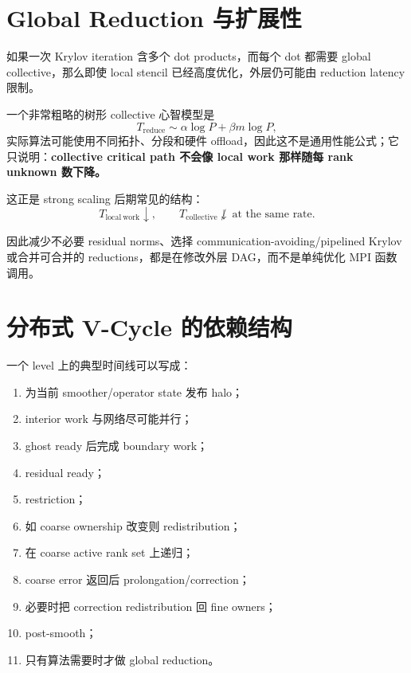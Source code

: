 \section{Global Reduction 与扩展性}

如果一次 Krylov iteration 含多个 dot products，而每个 dot 都需要 global collective，那么即使 local stencil 已经高度优化，外层仍可能由 reduction latency 限制。

一个非常粗略的树形 collective 心智模型是
\begin{equation}
T_{\mathrm{reduce}}
\sim
\alpha \log P
+
\beta m \log P,
\end{equation}
实际算法可能使用不同拓扑、分段和硬件 offload，因此这不是通用性能公式；它只说明：\textbf{collective critical path 不会像 local work 那样随每 rank unknown 数下降。}

这正是 strong scaling 后期常见的结构：
\begin{equation}
T_{\mathrm{local\ work}}
\downarrow,
\qquad
T_{\mathrm{collective}}
\not\downarrow\ \text{at the same rate}.
\end{equation}

因此减少不必要 residual norms、选择 communication-avoiding/pipelined Krylov 或合并可合并的 reductions，都是在修改外层 DAG，而不是单纯优化 MPI 函数调用。

\section{分布式 V-Cycle 的依赖结构}

一个 level 上的典型时间线可以写成：

\begin{enumerate}
\item 为当前 smoother/operator state 发布 halo；
\item interior work 与网络尽可能并行；
\item ghost ready 后完成 boundary work；
\item residual ready；
\item restriction；
\item 如 coarse ownership 改变则 redistribution；
\item 在 coarse active rank set 上递归；
\item coarse error 返回后 prolongation/correction；
\item 必要时把 correction redistribution 回 fine owners；
\item post-smooth；
\item 只有算法需要时才做 global reduction。
\end{enumerate}

